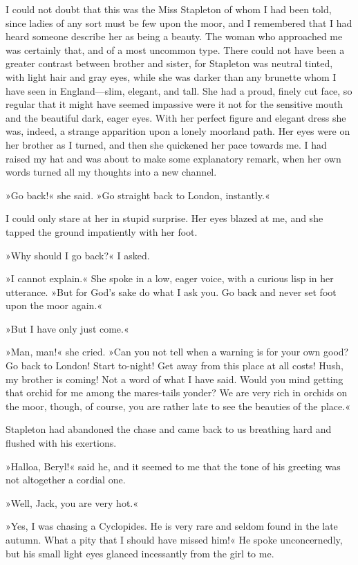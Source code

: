I could not doubt that this was the Miss Stapleton of whom I had been told, since ladies of any sort must be few upon the moor, and I remembered that I had heard someone describe her as being a beauty. The woman who approached me was certainly that, and of a most uncommon type. There could not have been a greater contrast between brother and sister, for Stapleton was neutral tinted, with light hair and gray eyes, while she was darker than any brunette whom I have seen in England\allowbreak---\allowbreak slim, elegant, and tall. She had a proud, finely cut face, so regular that it might have seemed impassive were it not for the sensitive mouth and the beautiful dark, eager eyes. With her perfect figure and elegant dress she was, indeed, a strange apparition upon a lonely moorland path. Her eyes were on her brother as I turned, and then she quickened her pace towards me. I had raised my hat and was about to make some explanatory remark, when her own words turned all my thoughts into a new channel.

»Go back!« she said. »Go straight back to London, instantly.«

I could only stare at her in stupid surprise. Her eyes blazed at me, and she tapped the ground impatiently with her foot.

»Why should I go back?« I asked.

»I cannot explain.« She spoke in a low, eager voice, with a curious lisp in her utterance. »But for God's sake do what I ask you. Go back and never set foot upon the moor again.«

»But I have only just come.«

»Man, man!« she cried. »Can you not tell when a warning is for your own good? Go back to London! Start to-night! Get away from this place at all costs! Hush, my brother is coming! Not a word of what I have said. Would you mind getting that orchid for me among the mares-tails yonder? We are very rich in orchids on the moor, though, of course, you are rather late to see the beauties of the place.«

Stapleton had abandoned the chase and came back to us breathing hard and flushed with his exertions.

»Halloa, Beryl!« said he, and it seemed to me that the tone of his greeting was not altogether a cordial one.

»Well, Jack, you are very hot.«

»Yes, I was chasing a Cyclopides. He is very rare and seldom found in the late autumn. What a pity that I should have missed him!« He spoke unconcernedly, but his small light eyes glanced incessantly from the girl to me.

